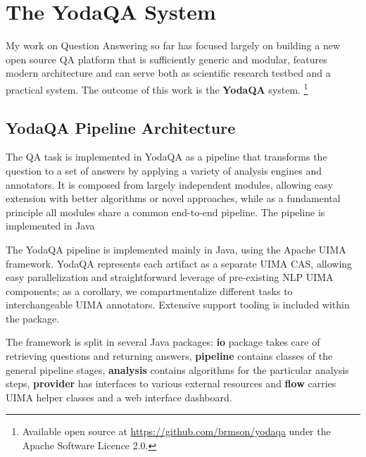\chapter{The YodaQA System}
\label{ch:work}

My work on Question Answering so far has focused largely on building
a new open source QA platform that is sufficiently generic and modular,
features modern architecture and can serve both as scientific
research testbed and a practical system.
The outcome of this work is the \textbf{YodaQA} system.%
\footnote{Available open source at \url{https://github.com/brmson/yodaqa}
under the Apache Software Licence 2.0.}
\citep{YodaQAPoster2015,YodaQACLEF2015}

\section{YodaQA Pipeline Architecture}
\label{sec:yodaqaarch}

The QA task is implemented in YodaQA as a pipeline that transforms the
question to a set of answers by applying a variety of analysis engines
and annotators.
It is composed from largely independent modules,
allowing easy extension with better algorithms
or novel approaches, while as a fundamental principle
all modules share a common end-to-end pipeline.
The pipeline is implemented in Java

The YodaQA pipeline is implemented mainly in Java,
using the Apache UIMA framework. \citep{UIMA}
YodaQA represents each artifact
as a separate UIMA CAS, allowing easy
parallelization and straightforward
leverage of pre-existing NLP UIMA components;
as a corollary, we compartmentalize
different tasks to interchangeable UIMA annotators.
Extensive support
tooling is included within the package.

The framework is split in several Java packages: \textbf{io} package takes care
of retrieving questions and returning answers, \textbf{pipeline} contains
classes of the general pipeline stages, \textbf{analysis} contains
algorithms for the particular analysis steps, \textbf{provider} has interfaces
to various external resources and \textbf{flow} carries UIMA helper classes
and a web interface dashboard.

